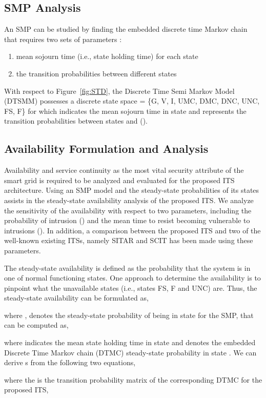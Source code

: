 \documentclass[preprint,number,12pt]{elsarticle}
\begin{document}
\subsection{SMP Analysis}
An SMP can be studied by finding the embedded discrete time Markov chain that requires two sets of parameters \citep{Madan2004167}\citep{Griffin2005c}:
\begin{enumerate}
\item mean sojourn time (i.e., state holding time) for each state
\item the transition probabilities between different states
\end{enumerate}
With respect to Figure~\ref{fig:STD}, the Discrete Time Semi Markov Model (DTSMM) possesses a discrete state space = \{G, V, I, UMC, DMC, DNC, UNC, FS, F\} for which  indicates the mean sojourn time in state  and  represents the transition probabilities between states  and  ().
\subsection {Availability Formulation and Analysis}
Availability and service continuity as the most vital security attribute of the smart grid is required to be analyzed and evaluated for the proposed ITS architecture. Using an SMP model and the steady-state probabilities of its states assists in the steady-state availability analysis of the proposed ITS. We analyze the sensitivity of the availability with respect to two parameters, including the probability of intrusion () and the mean time to resist becoming vulnerable to intrusions (). In addition, a comparison between the proposed ITS and two of the well-known existing ITSs, namely SITAR and SCIT has been made using these parameters.

The steady-state availability  is defined as the probability that the system is in one of normal functioning states. One approach to determine the availability is to pinpoint what the unavailable states (i.e., states FS, F and UNC) are. Thus, the steady-state availability  can be formulated as,

where ,  denotes the steady-state probability of being in state  for the SMP, that can be computed as,

where  indicates the mean state holding time in state  and  denotes the embedded Discrete Time Markov chain (DTMC) steady-state probability in state . We can derive s from the following two equations,


where the  is the transition probability matrix of the corresponding DTMC for the proposed ITS,
\end{document}
